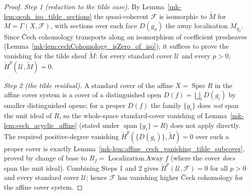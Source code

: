 \begin{proof}
  \emph{Step 1 (reduction to the tilde case).} By Lemma~\ref{mk-lem:qcoh_iso_tilde_sections} the
  quasi-coherent \(\mathcal{F}\) is isomorphic to \(\widetilde{M}\) for
  \(M = \Gamma(X, \mathcal{F})\), with sections over each face \(D(g_\sigma)\) the away localisation
  \(M_{g_\sigma}\). Since {\v C}ech cohomology transports along an isomorphism of coefficient
  presheaves (Lemma~\ref{mk-lem:cechCohomology_isZero_of_iso}), it suffices to prove the vanishing for
  the tilde sheaf \(\widetilde{M}\): for every standard cover \(\mathcal{U}\) and every \(p > 0\),
  \(\check{H}^p(\mathcal{U}, \widetilde{M}) = 0\).

  \emph{Step 2 (the tilde residual).} A standard cover of the affine \(X = \operatorname{Spec} R\) in
  the affine cover system is a cover of a distinguished open \(D(f) = \bigsqcup_i D(g_i)\) by smaller
  distinguished opens; for a proper \(D(f)\) the family \(\{g_i\}\) does \emph{not} span the unit
  ideal of \(R\), so the whole-space standard-cover vanishing of
  Lemma~\ref{mk-lem:cech_acyclic_affine} (stated under \(\operatorname{span}\{g_i\} = R\)) does not
  apply directly. The required positive-degree vanishing \(\check{H}^p(\{D(g_i)\}, \widetilde{M}) = 0\)
  over such a proper cover is exactly Lemma~\ref{mk-lem:affine_cech_vanishing_tilde_subcover}, proved by
  change of base to \(R_f = \operatorname{Localization.Away} f\) (where the cover \emph{does} span the
  unit ideal). Combining Steps 1 and 2 gives \(\check{H}^p(\mathcal{U}, \mathcal{F}) = 0\) for all
  \(p > 0\) and every standard cover \(\mathcal{U}\); hence \(\mathcal{F}\) has vanishing higher
  {\v C}ech cohomology for the affine cover system.
\end{proof}


